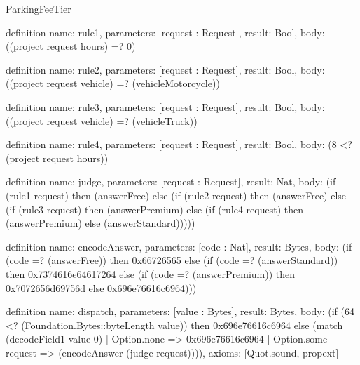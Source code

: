 \begin{lexlean}{ParkingFeeTier}
\begin{semanticmodule}
definition{
  name: rule1,
  parameters: [request : Request],
  result: Bool,
  body: ((project request hours) =? 0)
}

definition{
  name: rule2,
  parameters: [request : Request],
  result: Bool,
  body: ((project request vehicle) =? (vehicleMotorcycle))
}

definition{
  name: rule3,
  parameters: [request : Request],
  result: Bool,
  body: ((project request vehicle) =? (vehicleTruck))
}

definition{
  name: rule4,
  parameters: [request : Request],
  result: Bool,
  body: (8 <? (project request hours))
}

definition{
  name: judge,
  parameters: [request : Request],
  result: Nat,
  body: (if (rule1 request) then (answerFree) else (if (rule2 request) then (answerFree) else (if (rule3 request) then (answerPremium) else (if (rule4 request) then (answerPremium) else (answerStandard)))))
}

definition{
  name: encodeAnswer,
  parameters: [code : Nat],
  result: Bytes,
  body: (if (code =? (answerFree)) then 0x66726565 else (if (code =? (answerStandard)) then 0x7374616e64617264 else (if (code =? (answerPremium)) then 0x7072656d69756d else 0x696e76616c6964)))
}

definition{
  name: dispatch,
  parameters: [value : Bytes],
  result: Bytes,
  body: (if (64 <? (Foundation.Bytes::byteLength value)) then 0x696e76616c6964 else (match (decodeField1 value 0)
    | Option.none => 0x696e76616c6964
    | Option.some request => (encodeAnswer (judge request)))),
  axioms: [Quot.sound, propext]
}


\end{semanticmodule}
\end{lexlean}

